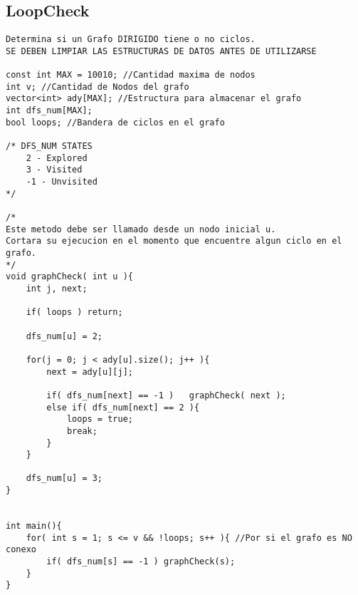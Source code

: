 \documentclass[10pt,letterpaper,twocolumn,twosided]{article}
\begin{document}
\subsection{LoopCheck}
\begin{lstlisting}
Determina si un Grafo DIRIGIDO tiene o no ciclos.
SE DEBEN LIMPIAR LAS ESTRUCTURAS DE DATOS ANTES DE UTILIZARSE

const int MAX = 10010; //Cantidad maxima de nodos
int v; //Cantidad de Nodos del grafo
vector<int> ady[MAX]; //Estructura para almacenar el grafo
int dfs_num[MAX]; 
bool loops; //Bandera de ciclos en el grafo

/* DFS_NUM STATES
	2 - Explored
	3 - Visited
 	-1 - Unvisited
*/

/*
Este metodo debe ser llamado desde un nodo inicial u.
Cortara su ejecucion en el momento que encuentre algun ciclo en el grafo.
*/
void graphCheck( int u ){
	int j, next;
	
	if( loops ) return;
	
	dfs_num[u] = 2;
	
	for(j = 0; j < ady[u].size(); j++ ){
		next = ady[u][j];
		
		if( dfs_num[next] == -1 )	graphCheck( next );
		else if( dfs_num[next] == 2 ){
			loops = true;
			break;
		}
	}
	
	dfs_num[u] = 3;
}


int main(){
	for( int s = 1; s <= v && !loops; s++ ){ //Por si el grafo es NO conexo
		if( dfs_num[s] == -1 ) graphCheck(s);
	}
}\end{lstlisting}
\end{document}
